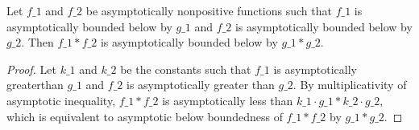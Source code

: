 \begin{lemma}
    \label{lemma:asymp_bounded_below_nonpos_mul}
    \leanok
    Let $f\_1$ and $f\_2$ be asymptotically nonpositive functions such that $f\_1$ 
    is asymptotically bounded below by $g\_1$ and $f\_2$ is asymptotically bounded 
    below by $g\_2$. Then $f\_1 * f\_2$ is asymptotically bounded below by $g\_1 * g\_2$.
\end{lemma}

\begin{proof}
    \leanok
    Let $k\_1$ and $k\_2$ be the constants such that $f\_1$ is asymptotically greaterthan
    $g\_1$ and $f\_2$ is asymptotically greater than $g\_2$. By multiplicativity of asymptotic 
    inequality, $f\_1 * f\_2$ is asymptotically less than $k\_1 \cdot g\_1 * k\_2 \cdot g\_2$,
    which is equivalent to asymptotic below boundedness of $f\_1 * f\_2$ by $g\_1 * g\_2$.
\end{proof}
